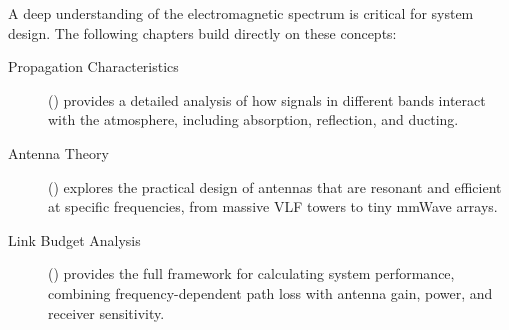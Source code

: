 \begin{importantbox}[title={Further Reading}]
    A deep understanding of the electromagnetic spectrum is critical for system design. The following chapters build directly on these concepts:
    \begin{description}
        \item[Propagation Characteristics] () provides a detailed analysis of how signals in different bands interact with the atmosphere, including absorption, reflection, and ducting.
        \item[Antenna Theory] () explores the practical design of antennas that are resonant and efficient at specific frequencies, from massive VLF towers to tiny mmWave arrays.
        \item[Link Budget Analysis] () provides the full framework for calculating system performance, combining frequency-dependent path loss with antenna gain, power, and receiver sensitivity.
    \end{description}
\end{importantbox}
